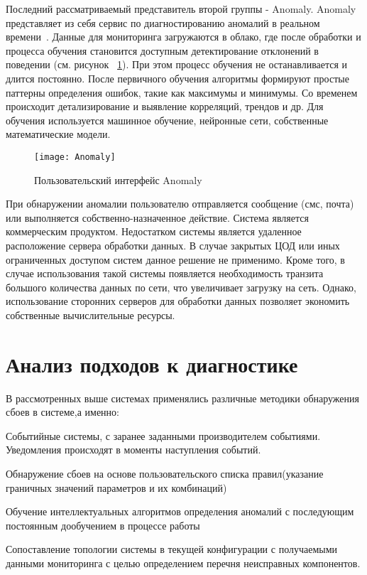 Последний рассматриваемый представитель второй группы - Anomaly. Anomaly представляет из себя сервис по диагностированию аномалий в реальном времени~\cite{Anomaly}. Данные для мониторинга загружаются в облако, где после обработки и процесса обучения становится доступным детектирование отклонений в поведении (см. рисунок ~\ref{fig:Anomaly}). При этом процесс обучения не останавливается и длится постоянно. После первичного обучения алгоритмы формируют простые паттерны определения ошибок, такие как максимумы и минимумы. Со временем происходит детализирование и выявление корреляций, трендов и др. Для обучения используется машинное обучение, нейронные сети, собственные математические модели. 
\begin{figure}[!h]
	\centering
	\texttt{[image: Anomaly]}
	\caption{Пользовательский интерфейс Anomaly}
	\label{fig:Anomaly}
\end{figure}

При обнаружении аномалии пользователю отправляется сообщение (смс, почта) или выполняется собственно-назначенное действие. Система является коммерческим продуктом. Недостатком системы является удаленное расположение сервера обработки данных. В случае закрытых ЦОД или иных ограниченных доступом систем данное решение не применимо. Кроме того, в случае использования такой системы появляется необходимость транзита большого количества данных по сети, что увеличивает загрузку на сеть. Однако, использование сторонних серверов для обработки данных позволяет экономить собственные вычислительные ресурсы. 

\section{Анализ подходов к диагностике}
В рассмотренных выше системах применялись различные методики обнаружения сбоев в системе,а именно:
\begin{itemize*}
	\item{Событийные системы, с заранее заданными производителем событиями. Уведомления происходят в моменты наступления событий.}
	\item{Обнаружение сбоев на основе пользовательского списка правил(указание граничных значений параметров и их комбинаций)}
	\item{Обучение интеллектуальных алгоритмов определения аномалий с последующим постоянным дообучением в процессе работы}
	\item{Сопоставление топологии системы в текущей конфигурации с получаемыми данными мониторинга с целью определением перечня неисправных компонентов.}
\end{itemize*}

